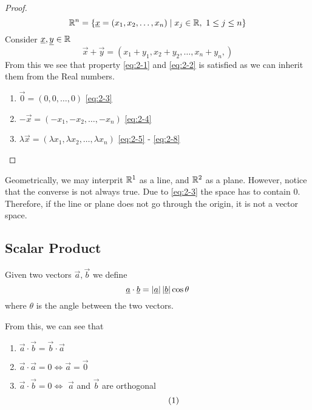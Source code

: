 \documentclass{article}
\numberwithin{equation}{section}
\begin{document}
\begin{eg}
\end{eg}
\begin{proof}
    \[
        \mathbb{R}^n = \{\underline{x} = (x_1, x_2, \ldots, x_n) \mid x_j \in \mathbb{R}, \ 1 \leq j \leq n\}
    \]
    Consider $\underline{x} , \underline{y} \in \mathbb{R}$
    \[
        \vec{x} + \vec{y} = (x_1 + y_1, x_2 + y_2, \ldots, x_n + y_n,)
    \]
    From this we see that property \eqref{eq:2-1} and \eqref{eq:2-2} is satisfied as we can inherit them from the Real numbers.

    \begin{enumerate}
        \item $\vec{0} = (0, 0, \ldots, 0)$ \hspace*{\fill}\eqref{eq:2-3}
        \item $-\vec{x} = (-x_1, -x_2, \ldots, -x_n)$ \hspace*{\fill}\eqref{eq:2-4}
        \item $\lambda\vec{x} = (\lambda x_1, \lambda x_2, \ldots, \lambda x_n)$ \hspace*{\fill}\eqref{eq:2-5} - \eqref{eq:2-8}
    \end{enumerate}
\end{proof}

Geometrically, we may interprit $\mathbb{R}^1$ as a line, and $\mathbb{R}^2$ as a plane. However, notice that the converse is not always true. Due to \eqref{eq:2-3} the space has to contain $0$. Therefore, if the line or plane does not go through the origin, it is not a vector space.

\subsection{Scalar Product}
\begin{defi}
    Given two vectors $\vec{a}, \vec{b}$ we define
    \[
        \underline{a} \cdot \underline{b} = \left\lvert \underline{a}\right\rvert\left\lvert \underline{b}\right\rvert\cos{\theta}  
    \]
    where $\theta$ is the angle between the two vectors.
\end{defi}
From this, we can see that
\begin{enumerate}
    \item $\vec{a} \cdot \vec{b} = \vec{b} \cdot \vec{a}$ 
    \item $\vec{a} \cdot \vec{a} = 0 \Leftrightarrow \vec{a} = \vec{0}$
    \item $\vec{a} \cdot \vec{b} = 0 \Leftrightarrow$ $\vec{a}$ and $\vec{b}$ are orthogonal
    \[\numberthis\]
\end{enumerate}
\end{document}
